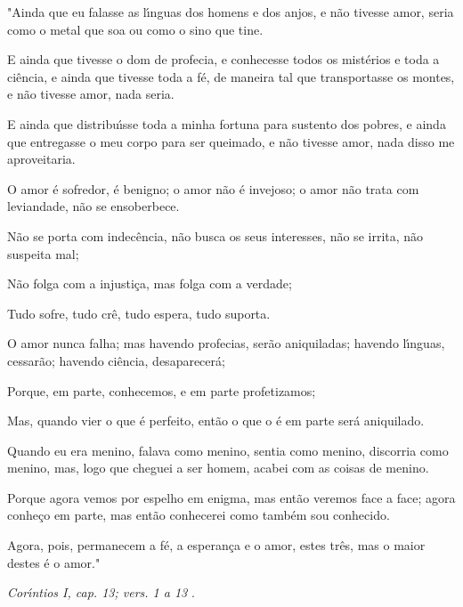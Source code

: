 \thispagestyle{empty}%
\newpage
\null\vfill
\begin{flushright}

"Ainda que eu falasse as l\'{\i}nguas dos homens e dos anjos, e n\~{a}o tivesse amor, seria como o metal que soa ou como o sino que tine.

E ainda que tivesse o dom de profecia, e conhecesse todos os mist\'{e}rios e toda a ci\^{e}ncia, e ainda que tivesse toda a f\'{e}, de maneira tal que transportasse os montes, e n\~{a}o tivesse amor, nada seria.

E ainda que distribu\'{\i}sse toda a minha fortuna para sustento dos pobres, e ainda que entregasse o meu corpo para ser queimado, e n\~{a}o tivesse amor, nada disso me aproveitaria.

O amor \'{e} sofredor, \'{e} benigno; o amor n\~{a}o \'{e} invejoso; o amor n\~{a}o trata com leviandade, n\~{a}o se ensoberbece.

N\~{a}o se porta com indec\^{e}ncia, n\~{a}o busca os seus interesses, n\~{a}o se irrita, n\~{a}o suspeita mal;

N\~{a}o folga com a injusti\c{c}a, mas folga com a verdade;

Tudo sofre, tudo cr\^{e}, tudo espera, tudo suporta.

O amor nunca falha; mas havendo profecias, ser\~{a}o aniquiladas; havendo l\'{\i}nguas, cessar\~{a}o; havendo ci\^{e}ncia, desaparecer\'{a};

Porque, em parte, conhecemos, e em parte profetizamos;

Mas, quando vier o que \'{e} perfeito, ent\~{a}o o que o \'{e} em parte ser\'{a} aniquilado.

Quando eu era menino, falava como menino, sentia como menino, discorria como menino, mas, logo que cheguei a ser homem, acabei com as coisas de menino.

Porque agora vemos por espelho em enigma, mas ent\~{a}o veremos face a face; agora conhe\c{c}o em parte, mas ent\~{a}o conhecerei como tamb\'{e}m sou conhecido.

Agora, pois, permanecem a f\'{e}, a esperan\c{c}a e o amor, estes tr\^{e}s, mas o maior destes \'{e} o amor."





\emph{Cor\'{\i}ntios I, cap. 13; vers. 1 a 13}
.
\end{flushright}
   \vspace{3.0cm}
